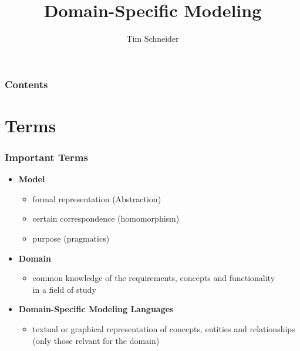 \documentclass[11 pt,t]{beamer}
\author{Tim Schneider}
\title{Domain-Specific Modeling}
\begin{document}
\frame{

\titlepage

}
\begin{frame}
\vspace{.5cm}
  \frametitle{Contents}
  \tableofcontents
\end{frame}

\section{Terms}
\begin{frame}
\vspace{.5cm}
  \frametitle{Important Terms}
  \begin{itemize}
    \item \textbf{Model}
      \begin{itemize}
       \item formal representation (Abstraction)
       \item certain correspondence (homomorphism)
       \item purpose (pragmatics)
      \end{itemize}
      
    \item \textbf{Domain}
      \begin{itemize}
       \item common knowledge of the requirements, concepts and functionality 
	    \\in a field of study
      \end{itemize}

    \item \textbf{Domain-Specific Modeling Languages}
    \begin{itemize}
       \item textual or graphical representation of concepts, entities and relationships
	      (only those relvant for the domain)
      \end{itemize}

  \end{itemize}
\end{frame}
\end{document}
